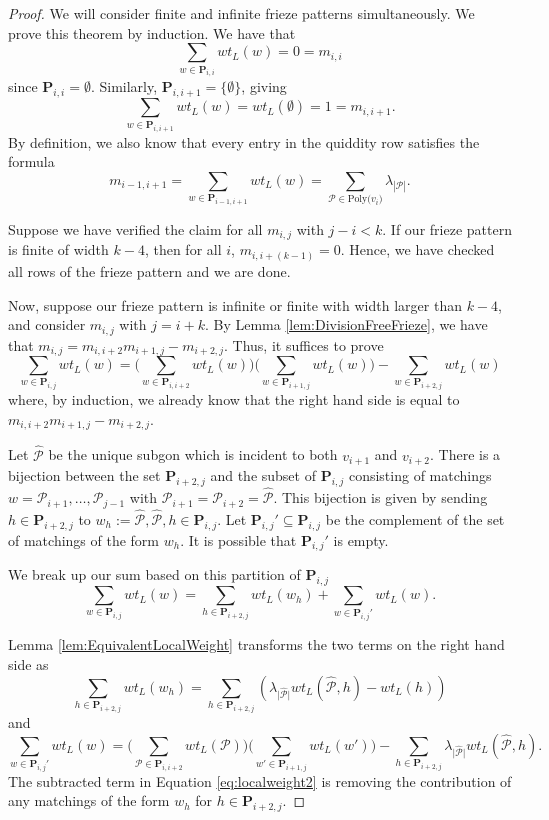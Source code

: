 \documentclass[12pt]{article}
\theoremstyle{remark}
\newcommand*{\polyset}[1]{\text{Poly($#1$)}}
\newcommand*{\pathset}[2]{\mathbf{P}_{#1,#2}}
\newcommand*{\poly}[1]{\mathcal{P}_{#1}}
\begin{document}
\begin{proof}
We will consider finite and infinite frieze patterns simultaneously. We prove this theorem by induction. We have that \[
\sum_{w \in \pathset{i}{i}} wt_L(w) = 0 = m_{i,i}
\]
since $\pathset{i}{i} = \emptyset$.
Similarly, $\pathset{i}{i+1} = \{\emptyset\}$, giving \[
\sum_{w \in \pathset{i}{i+1}} wt_L(w) = wt_L(\emptyset) = 1 = m_{i,i+1}.
\]
By definition, we also know that every entry in the quiddity row satisfies the formula
\[
m_{i-1,i+1} = \sum_{w\in \pathset{i-1}{i+1}}wt_L(w) = \sum_{\mathcal{P}\in \polyset{v_i}}\lambda_{|\mathcal{P}|}.
\]

Suppose we have verified the claim for all $m_{i,j}$ with $j - i < k$. If our frieze pattern is finite of width $k-4$, then for all $i$, $m_{i,i+(k-1)} = 0$. Hence, we have checked all rows of the frieze pattern and we are done. 

Now, suppose our frieze pattern is infinite or finite with width larger than $k-4$, and consider $m_{i,j}$ with $j = i + k$. By Lemma \ref{lem:DivisionFreeFrieze}, we have that $m_{i,j} = m_{i,i+2}m_{i+1,j} - m_{i+2,j}$. Thus, it suffices to prove \[
\sum_{w \in \pathset{i}{j}} wt_L(w) = \bigg(\sum_{w \in \pathset{i}{i+2}} wt_L(w)\bigg) \bigg( \sum_{w \in \pathset{i+1}{j}} wt_L(w) \bigg) - \sum_{w \in \pathset{i+2}{j}} wt_L(w)
\]
where, by induction, we already know that the right hand side is equal to $ m_{i,i+2}m_{i+1,j} - m_{i+2,j}$.

Let $\hat{\mathcal{P}}$ be the unique subgon which is incident to both $v_{i+1}$ and $v_{i+2}$. There is a bijection between the set $\pathset{i+2}{j}$ and the subset of $\pathset{i}{j}$ consisting of matchings $w = \poly{i+1},\ldots,\poly{j-1}$ with $\poly{i+1} = \poly{i+2} = \hat{\mathcal{P}}$. This bijection is given by sending $h \in \pathset{i+2}{j}$ to $w_h := \hat{\mathcal{P}}, \hat{\mathcal{P}}, h \in \pathset{i}{j}$. Let $\pathset{i}{j}' \subseteq \pathset{i}{j}$ be the complement of the set of matchings of the form $w_h$. It is possible that $\pathset{i}{j}'$ is empty. 

We break up our sum based on this partition of $\pathset{i}{j}$\[
\sum_{w \in \pathset{i}{j}} wt_L(w) = \sum_{h \in \pathset{i+2}{j}} wt_L(w_h) + \sum_{w \in \pathset{i}{j}'} wt_L(w).
\]

Lemma \ref{lem:EquivalentLocalWeight} transforms the two terms on the right hand side as \begin{equation}\label{eq:localweight1}
\sum_{h \in \pathset{i+2}{j}} wt_L(w_h) = \sum_{h \in \pathset{i+2}{j}} (\lambda_{\vert \hat{\mathcal{P}} \vert} wt_L(\hat{\mathcal{P}},h) - wt_L(h))
\end{equation}
and
\begin{equation}\label{eq:localweight2}
\sum_{w \in \pathset{i}{j}'} wt_L(w) = \bigg(\sum_{\mathcal{P} \in \pathset{i}{i+2}} wt_L(\mathcal{P}) \bigg)\bigg( \sum_{w' \in \pathset{i+1}{j}} wt_L(w')\bigg) - \sum_{h \in\pathset{i+2}{j}} \lambda_{\vert \hat{\mathcal{P}} \vert} wt_L(\hat{\mathcal{P}},h).
\end{equation}
The subtracted term in Equation \ref{eq:localweight2} is removing the contribution of any matchings of the form $w_h$ for $h \in \pathset{i+2}{j}$.


\end{proof}
\end{document}
